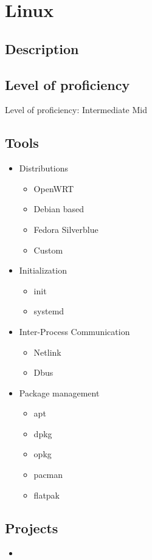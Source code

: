 \section{Linux}

\subsection{Description}

\subsection{Level of proficiency}

Level of proficiency: Intermediate Mid

\subsection{Tools}

\begin{itemize}
    \item Distributions
    \begin{itemize}
        \item OpenWRT
        \item Debian based
        \item Fedora Silverblue
        \item Custom
    \end{itemize}

    \item Initialization
    \begin{itemize}
        \item init
        \item systemd
    \end{itemize}

    \item Inter-Process Communication
    \begin{itemize}
        \item Netlink
        \item Dbus
    \end{itemize}

    \item Package management
    \begin{itemize}
        \item apt
        \item dpkg
        \item opkg
        \item pacman
        \item flatpak
    \end{itemize}

\end{itemize}

\subsection{Projects}

\begin{itemize}
    \item \noprojects
\end{itemize}

\newpage

